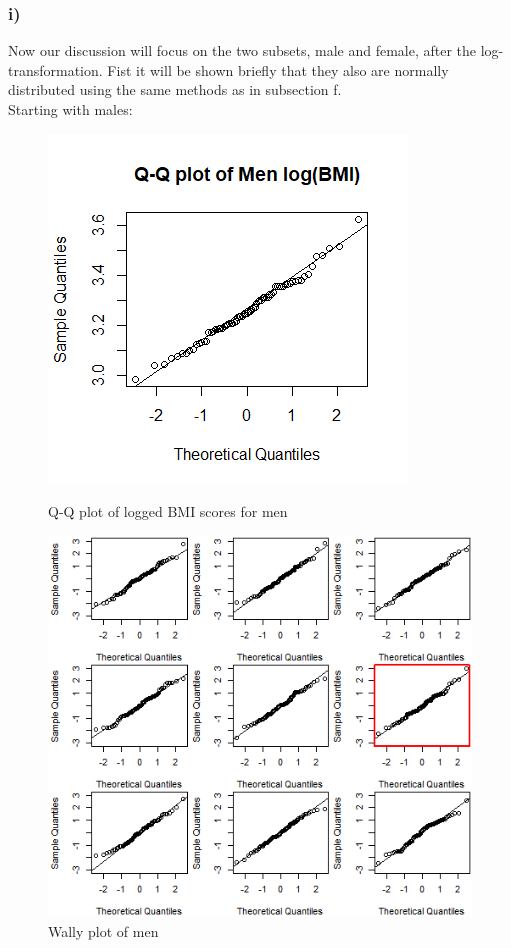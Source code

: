 \subsubsection{i)}
Now our discussion will focus on the two subsets, male and female, after the log-transformation. Fist it will be shown briefly that they also are normally distributed using the same methods as in subsection f. \\
Starting with males:
\newpage
\begin{figure}[h!]
    \centering
    \includegraphics[scale=0.9]{root/qqmenlog.png}
    \caption{Q-Q plot of logged BMI scores for men}
    \label{menqq}
    \includegraphics[scale=0.9]{root/menwally.png}
    \caption{Wally plot of men}
    \label{wallymen}
\end{figure}
